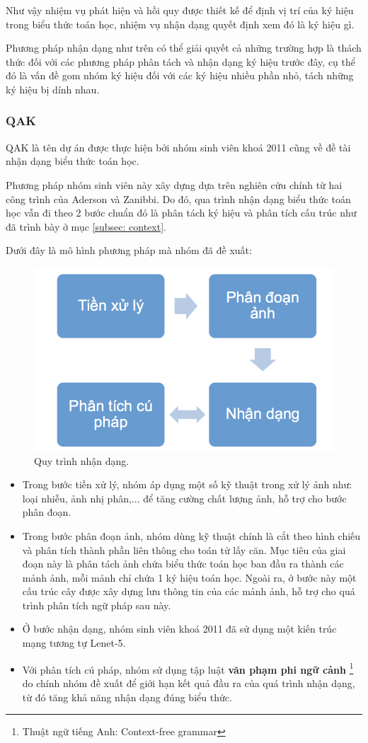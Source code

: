 \documentclass[a4paper]{article}
\theoremstyle{definition}
\begin{document}
	Như vậy nhiệm vụ phát hiện và hồi quy được thiết kế để định vị trí của ký hiệu trong biểu thức toán học, nhiệm vụ nhận dạng quyết định xem đó là ký hiệu gì.
	
	Phương pháp nhận dạng như trên có thể giải quyết cả những trường hợp là thách thức đối với các phương pháp phân tách và nhận dạng ký hiệu trước đây, cụ thể đó là vấn đề gom nhóm ký hiệu đối với các ký hiệu nhiều phần nhỏ, tách những ký hiệu bị dính nhau.
	
	\subsubsection{QAK\cite{qak}}
	QAK là tên dự án được thực hiện bởi nhóm sinh viên khoá 2011 cũng về đề tài nhận dạng biểu thức toán học.
	
	Phương pháp nhóm sinh viên này xây dựng dựa trên nghiên cứu chính từ hai công trình của Aderson\cite{anderson} và Zanibbi\cite{zanibbi}. Do đó, qua trình nhận dạng biểu thức toán học vẫn đi theo 2 bước chuẩn đó là phân tách ký hiệu và phân tích cấu trúc như đã trình bày ở mục \ref{subsec: context}. 
	
	Dưới đây là mô hình phương pháp mà nhóm đã đề xuất:
	
	\begin{figure}[!h]
		\centering
		\includegraphics[width=0.5\linewidth]{2011.png}
		\vspace{1cm}
		\caption{Quy trình nhận dạng.}
		
	\end{figure}
	
	\begin{itemize}
		\item Trong bước tiền xử lý, nhóm áp dụng một số kỹ thuật trong xử lý ảnh như: loại nhiễu, ảnh nhị phân,... để tăng cường chất lượng ảnh, hỗ trợ cho bước phân đoạn.
		\item Trong bước phân đoạn ảnh, nhóm dùng kỹ thuật chính là cắt theo hình chiếu\cite{segment} và phân tích thành phần liên thông\cite{segment} cho toán tử lấy căn. Mục tiêu của giai đoạn này là phân tách ảnh chứa biểu thức toán học ban đầu ra thành các mảnh ảnh, mỗi mảnh chỉ chứa 1 ký hiệu toán học. Ngoài ra, ở bước này một cấu trúc cây được xây dựng lưu thông tin của các mảnh ảnh, hỗ trợ cho quá trình phân tích ngữ pháp sau này.
		\item Ở bước nhận dạng, nhóm sinh viên khoá 2011 đã sử dụng một kiến trúc mạng tương tự Lenet-5\cite{yanlecun}.
		\item Với phân tích cú pháp, nhóm sử dụng tập luật \textbf{văn phạm phi ngữ cảnh} \footnote{Thuật ngữ tiếng Anh: Context-free grammar} do chính nhóm đề xuất để giới hạn kết quả đầu ra của quá trình nhận dạng, từ đó tăng khả năng nhận dạng đúng biểu thức. 
	\end{itemize}
	
\end{document}
